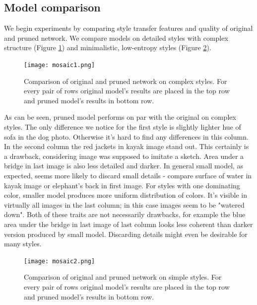 \documentclass[../Main.tex]{subfiles}
\begin{document}
\subsection{Model comparison}
We begin experiments by comparing style transfer features and quality of
original and pruned network. We compare models on detailed styles with complex 
structure (Figure \ref{fig:mosaic1}) and minimalistic, low-entropy styles 
(Figure \ref{fig:mosaic2}). 
        \begin{figure}[h!]
        \centering
            \texttt{[image: mosaic1.png]}
            \caption{Comparison of original and pruned network on complex styles. 
            For every pair of rows original model's results are placed in the
            top row and pruned model's results in bottom row.
            }
            \label{fig:mosaic1}
        \end{figure}
As can be seen, pruned model performs on par with the original on complex styles.
The only difference we notice for the first style is slightly lighter hue of sofa
in the dog photo. Otherwise it's hard to find any differences in this column.
In the second column the red jackets in kayak image stand out. This certainly is a drawback,
considering image was supposed to imitate a sketch. Area under a bridge in last 
image is also less detailed and darker. In general small model, as expected,
seems more likely to discard small details - compare surface of water in kayak image
or elephant's back in first image. For styles with one dominating color, smaller
model produces more uniform distribution of colors. It's visible in virtually
all images in the last column; in this case images seem to be "watered down".
Both of these traits are not necessarily drawbacks, for example the blue area
under the bridge in last image of last column looks less coherent than darker version
produced by small model. Discarding details might even be desirable for many styles.

        \begin{figure}[h!]
        \centering
            \texttt{[image: mosaic2.png]}
            \caption{Comparison of original and pruned network on simple styles. 
            For every pair of rows original model's results are placed in the
            top row and pruned model's results in bottom row.
            }
            \label{fig:mosaic2}
        \end{figure} 
 
\end{document}
